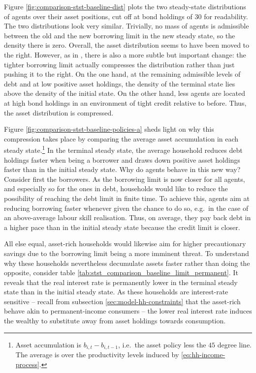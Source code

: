 \documentclass[12pt]{article} %
\numberwithin{equation}{section} %
\numberwithin{figure}{section}
\numberwithin{table}{section}
\begin{document}
Figure \ref{fig:comparison-stst-baseline-dist} plots the two steady-state distributions of agents over their asset positions, cut off at bond holdings of $30$ for readability. The two distributions look very similar. Trivially, no mass of agents is admissible between the old and the new borrowing limit in the new steady state, so the density there is zero. Overall, the asset distribution seems to have been moved to the right. However, as in \textcite{gl2017}, there is also a more subtle but important change: the tighter borrowing limit actually compresses the distribution rather than just pushing it to the right. On the one hand, at the remaining admissible levels of debt and at low positive asset holdings, the density of the terminal state lies above the density of the initial state. On the other hand, less agents are located at high bond holdings in an environment of tight credit relative to before. Thus, the asset distribution is compressed.

Figure \ref{fig:comparison-stst-baseline-policies-a} sheds light on why this compression takes place by comparing the average asset accumulation in each steady state.\footnote{Asset accumulation is $b_{i,t} - b_{i,t-1}$, i.e.~the asset policy less the $45$ degree line. The average is over the productivity levels induced by \eqref{eq:hh-income-process}.} In the terminal steady state, the average household reduces debt holdings faster when being a borrower and draws down positive asset holdings faster than in the initial steady state. Why do agents behave in this new way? Consider first the borrowers. As the borrowing limit is now closer for all agents, and especially so for the ones in debt, households would like to reduce the possibility of reaching the debt limit in finite time. To achieve this, agents aim at reducing borrowing faster whenever given the chance to do so, e.g.~in the case of an above-average labour skill realisation. Thus, on average, they pay back debt in a higher pace than in the initial steady state because the credit limit is closer.

All else equal, asset-rich households would likewise aim for higher precautionary savings due to the borrowing limit being a more imminent threat. To understand why these households nevertheless decumulate assets faster rather than doing the opposite, consider table \ref{tab:stst_comparison_baseline_limit_permanent}. It reveals that the real interest rate is permanently lower in the terminal steady state than in the initial steady state. As these households are interest-rate sensitive -- recall from subsection \ref{sec:model-hh-constraints} that the asset-rich behave akin to permanent-income consumers -- the lower real interest rate induces the wealthy to substitute away from asset holdings towards consumption. 
\end{document}
